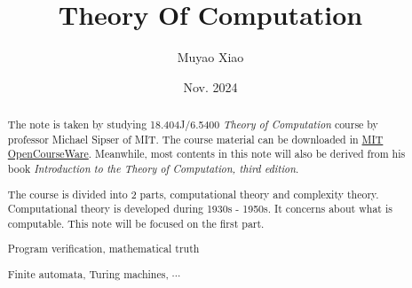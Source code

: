 \documentclass[a4paper]{report}
\title{Theory Of Computation}
\author{Muyao Xiao}
\date{Nov. 2024}
\begin{document}
\maketitle

\begin{abstract}
    The note is taken by studying 18.404J/6.5400 \textit{Theory of Computation} course by professor Michael Sipser of MIT. The course material can be downloaded in \href{https://ocw.mit.edu/courses/18-404j-theory-of-computation-fall-2020/}{MIT OpenCourseWare}. Meanwhile, most contents in this note will also be derived from his book \textit{Introduction to the Theory of Computation, third edition}.

    The course is divided into 2 parts, computational theory and complexity theory. Computational theory is developed during 1930s - 1950s. It concerns about what is computable. This note will be focused on the first part.

\begin{eg}
    Program verification, mathematical truth
\end{eg}

\begin{eg}
    Finite automata, Turing machines, \(\cdots\) 
\end{eg}
\end{abstract}

\tableofcontents


\pagestyle{plain}
\printbibliography{}
\end{document}
